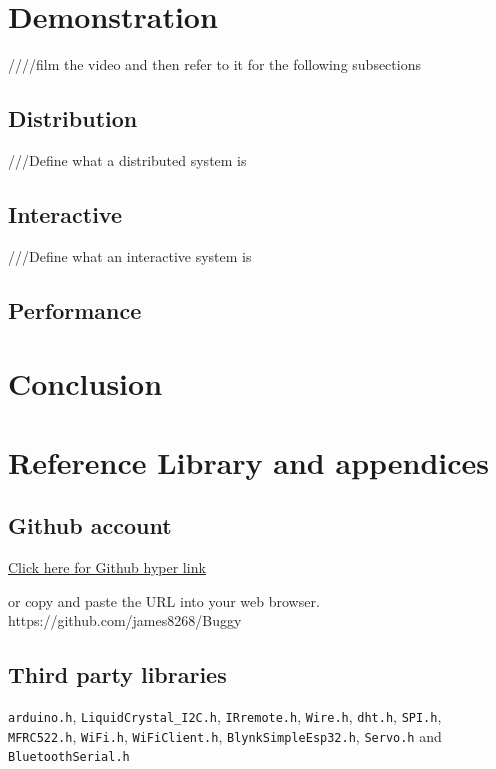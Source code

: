 \documentclass[8pt, a4paper]{article}
\begin{document}
\section{Demonstration}
////film the video and then refer to it for the following subsections


\subsection{Distribution}
///Define what a distributed system is 

\subsection{Interactive}
///Define what an interactive system is

\subsection{Performance}






\section{Conclusion}


\section{Reference Library and appendices}
\subsection{Github account}

\href{https://github.com/james8268/Buggy}{Click here for Github hyper link} 

or copy and paste the URL into your web browser. https://github.com/james8268/Buggy

\listoffigures

\subsection{Third party libraries}

\verb|arduino.h|, \verb|LiquidCrystal_I2C.h|, \verb|IRremote.h|, \verb|Wire.h|, \verb|dht.h|, \verb|SPI.h|, \verb|MFRC522.h|, \verb|WiFi.h|, \verb|WiFiClient.h|, \verb|BlynkSimpleEsp32.h|, \verb|Servo.h| and \verb|BluetoothSerial.h|
\end{document}

